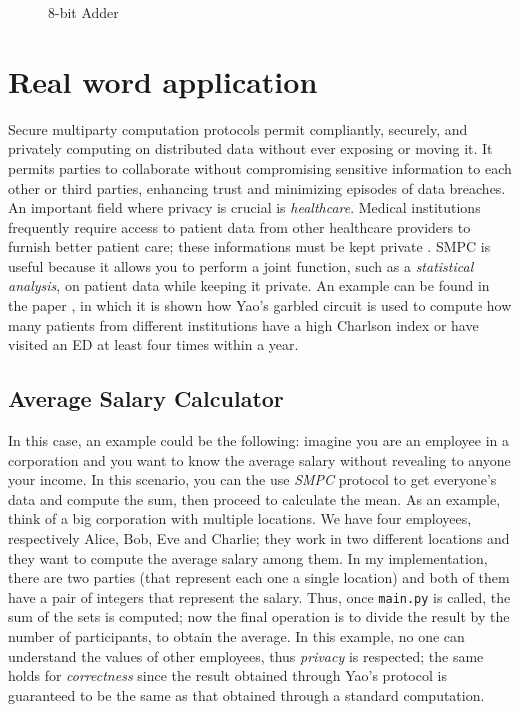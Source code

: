 \documentclass[12pt]{article}
\newcommand{\inlinecode}{\texttt}
\begin{document}
\begin{figure}[!h]
    \caption{8-bit Adder}\label{circuit}
\end{figure}

\section{Real word application}\label{sec:world}
Secure multiparty computation protocols permit compliantly, securely, and privately computing on distributed data without ever exposing or moving it. It permits parties to collaborate without compromising sensitive information to each other or third parties, enhancing trust and minimizing episodes of data breaches. An important field where privacy is crucial is \textit{healthcare}. Medical institutions frequently require access to patient data from other healthcare providers to furnish better patient care; these informations must be kept private \cite{application}. SMPC is useful because it allows you to perform a joint function, such as a \textit{statistical analysis}, on patient data while keeping it private. An example can be found in the paper \cite{healthcare}, in which it is shown how Yao's garbled circuit is used to compute how many patients from different institutions have a high Charlson index or have visited an ED at least four times within a year.
\subsection{Average Salary Calculator}
In this case, an example could be the following: imagine you are an employee in a corporation and you want to know the average salary without revealing to anyone your income. In this scenario, you can the use \textit{SMPC} protocol to get everyone's data and compute the sum, then proceed to calculate the mean. 
As an example, think of a big corporation with multiple locations. We have four employees, respectively Alice, Bob, Eve and Charlie; they work in two different locations and they want to compute the average salary among them. In my implementation, there are two parties (that represent each one a single location) and both of them have a pair of integers that represent the salary. Thus, once \inlinecode{main.py} is called, the sum of the sets is computed; now the final operation is to divide the result by the number of participants, to obtain the average.
In this example, no one can understand the values of other employees, thus \textit{privacy} is respected; the same holds for \textit{correctness} since the result obtained through Yao's protocol is guaranteed to be the same as that obtained through a standard computation. 
\end{document}
